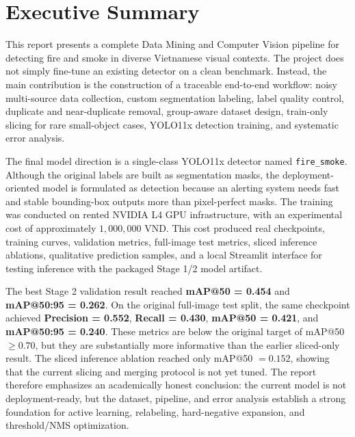 \documentclass[12pt,a4paper]{report}
\newcommand{\code}[1]{\texttt{#1}}
\newcommand{\metric}[1]{\textbf{#1}}
\begin{document}
\clearpage
{}

\chapter*{Executive Summary}
This report presents a complete Data Mining and Computer Vision pipeline for detecting fire and smoke in diverse Vietnamese visual contexts. The project does not simply fine-tune an existing detector on a clean benchmark. Instead, the main contribution is the construction of a traceable end-to-end workflow: noisy multi-source data collection, custom segmentation labeling, label quality control, duplicate and near-duplicate removal, group-aware dataset design, train-only slicing for rare small-object cases, YOLO11x detection training, and systematic error analysis.

The final model direction is a single-class YOLO11x detector named \code{fire\_smoke}. Although the original labels are built as segmentation masks, the deployment-oriented model is formulated as detection because an alerting system needs fast and stable bounding-box outputs more than pixel-perfect masks. The training was conducted on rented NVIDIA L4 GPU infrastructure, with an experimental cost of approximately \(1{,}000{,}000\) VND. This cost produced real checkpoints, training curves, validation metrics, full-image test metrics, sliced inference ablations, qualitative prediction samples, and a local Streamlit interface for testing inference with the packaged Stage 1/2 model artifact.

The best Stage 2 validation result reached \metric{mAP@50 = 0.454} and \metric{mAP@50:95 = 0.262}. On the original full-image test split, the same checkpoint achieved \metric{Precision = 0.552}, \metric{Recall = 0.430}, \metric{mAP@50 = 0.421}, and \metric{mAP@50:95 = 0.240}. These metrics are below the original target of mAP@50 \(\geq 0.70\), but they are substantially more informative than the earlier sliced-only result. The sliced inference ablation reached only mAP@50 \(=0.152\), showing that the current slicing and merging protocol is not yet tuned. The report therefore emphasizes an academically honest conclusion: the current model is not deployment-ready, but the dataset, pipeline, and error analysis establish a strong foundation for active learning, relabeling, hard-negative expansion, and threshold/NMS optimization.

\end{document}
